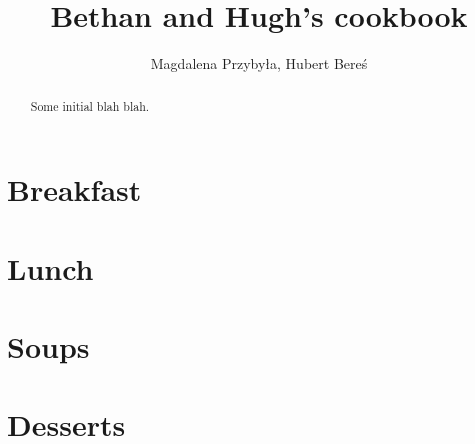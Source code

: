 \documentclass[%
a4paper,
11pt
]{article}
\begin{document}
\title{Bethan and Hugh's cookbook}
\author{Magdalena Przybyła, Hubert Bereś}
\maketitle

\begin{abstract}
    Some initial blah blah.
\end{abstract}

\tableofcontents

\vspace{5em}
\newpage

\section{Breakfast}


\newpage

\newpage

\newpage

\newpage

\newpage

\newpage

\section{Lunch}


\newpage

\newpage

\newpage

\newpage

\newpage

\newpage

\newpage

\section{Soups}


\newpage

\newpage

\newpage

\newpage

\newpage

\section{Desserts}

\newpage

\newpage

\newpage

\newpage

\newpage

\newpage

\newpage

\newpage
\end{document}
